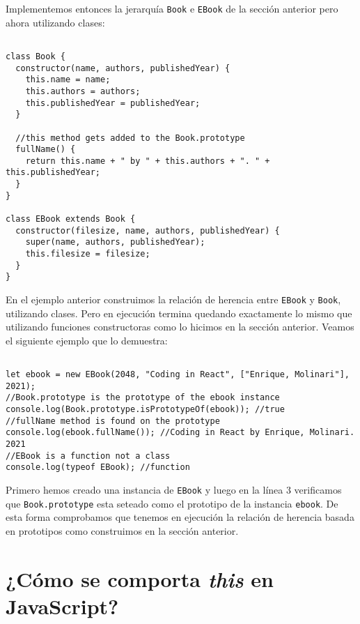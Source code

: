 \documentclass[a4paper, oneside, titlepage, 12pt]{book}
\begin{document}
Implementemos entonces la jerarquía \texttt{Book} e \texttt{EBook} de la sección anterior pero ahora utilizando clases:

\begin{verbatim}

class Book {
  constructor(name, authors, publishedYear) {
    this.name = name;
    this.authors = authors;
    this.publishedYear = publishedYear;
  }

  //this method gets added to the Book.prototype
  fullName() {
    return this.name + " by " + this.authors + ". " + this.publishedYear;
  }
}

class EBook extends Book {
  constructor(filesize, name, authors, publishedYear) {
    super(name, authors, publishedYear);
    this.filesize = filesize;
  }
}
\end{verbatim}

En el ejemplo anterior construimos la relación de herencia entre \texttt{EBook} y \texttt{Book}, utilizando clases. Pero en ejecución termina quedando exactamente lo mismo que utilizando funciones constructoras como lo hicimos en la sección anterior. Veamos el siguiente ejemplo que lo demuestra:

\begin{verbatim}

let ebook = new EBook(2048, "Coding in React", ["Enrique, Molinari"], 2021);
//Book.prototype is the prototype of the ebook instance
console.log(Book.prototype.isPrototypeOf(ebook)); //true
//fullName method is found on the prototype
console.log(ebook.fullName()); //Coding in React by Enrique, Molinari. 2021
//EBook is a function not a class
console.log(typeof EBook); //function
\end{verbatim}

Primero hemos creado una instancia de \texttt{EBook} y luego en la línea 3 verificamos que \texttt{Book.prototype} esta seteado como el prototipo de la instancia \texttt{ebook}. De esta forma comprobamos que tenemos en ejecución la relación de herencia basada en prototipos como construimos en la sección anterior.

\section{¿Cómo se comporta \textit{this} en JavaScript?} \label{meaning_of_this}
\end{document}
